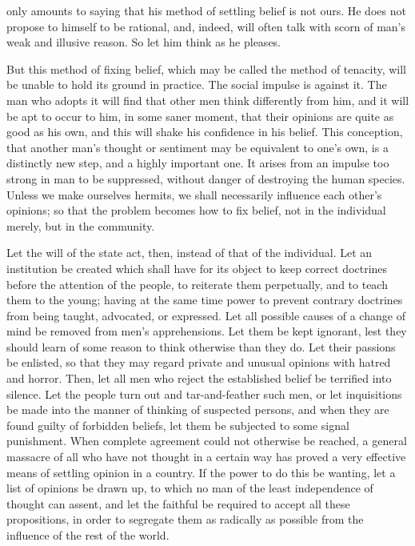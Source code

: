 only amounts to saying that his method of settling belief is not ours. He does not propose to himself to be rational, and, indeed, will often talk with scorn of man's weak and illusive reason. So let him think as he pleases.

But this method of fixing belief, which may be called the method of tenacity, will be unable to hold its ground in practice. The social impulse is against it. The man who adopts it will find that other men think differently from him, and it will be apt to occur to him, in some saner moment, that their opinions are quite as good as his own, and this will shake his confidence in his belief. This conception, that another man's thought or sentiment may be equivalent to one's own, is a distinctly new step, and a highly important one. It arises from an impulse too strong in man to be suppressed, without danger of destroying the human species. Unless we make ourselves hermits, we shall necessarily influence each other's opinions; so that the problem becomes how to fix belief, not in the individual merely, but in the community.

Let the will of the state act, then, instead of that of the individual. Let an institution be created which shall have for its object to keep correct doctrines before the attention of the people, to reiterate them perpetually, and to teach them to the young; having at the same time power to prevent contrary doctrines from being taught, advocated, or expressed. Let all possible causes of a change of mind be removed from men's apprehensions. Let them be kept ignorant, lest they should learn of some reason to think otherwise than they do. Let their passions be enlisted, so that they may regard private and unusual opinions with hatred and horror. Then, let all men who reject the established belief be terrified into silence. Let the people turn out and tar-and-feather such men, or let inquisitions be made into the manner of thinking of suspected persons, and when they are found guilty of forbidden beliefs, let them be subjected to some signal punishment. When complete agreement could not otherwise be reached, a general massacre of all who have not thought in a certain way has proved a very effective means of settling opinion in a country. If the power to do this be wanting, let a list of opinions be drawn up, to which no man of the least independence of thought can assent, and let the faithful be required to accept all these propositions, in order to segregate them as radically as possible from the influence of the rest of the world.

